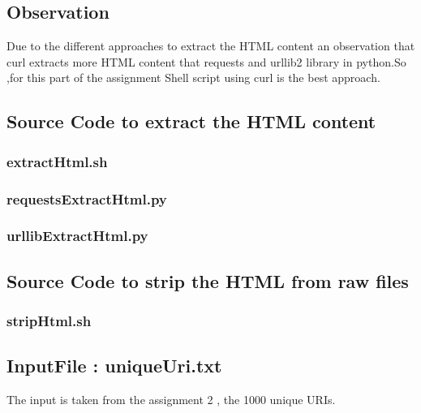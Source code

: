 \documentclass[12pt]{article}
\begin{document}
\subsection{Observation}
Due to the different approaches to extract the HTML content an observation that curl extracts more HTML content that requests  and urllib2 library in python.So ,for this part of the assignment Shell script using curl is the best approach.
\newpage
\subsection{Source Code to extract the HTML content}
\subsubsection{extractHtml.sh}

\subsubsection{requestsExtractHtml.py}

\subsubsection{urllibExtractHtml.py}

\subsection{Source Code to strip the HTML from raw files}
\subsubsection{stripHtml.sh}

\newpage
\subsection{InputFile : uniqueUri.txt}

The input is taken from the assignment 2 , the 1000 unique URIs.

\newpage
\end{document}
